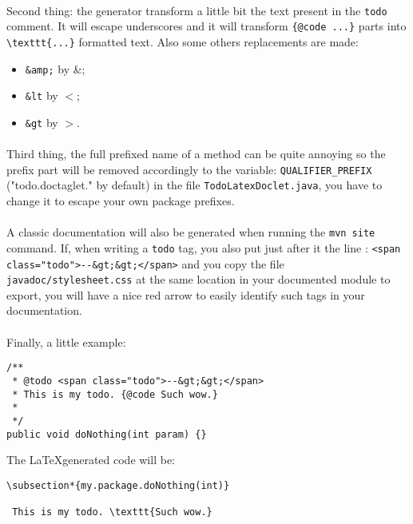 \documentclass[10pt,onecolumn]{report}
\begin{document}
\paragraph{}
Second thing: the generator transform a little bit the text present in the 
\verb!todo! comment. It will escape underscores and it will transform
\verb!{@code ...}! parts into \verb!\texttt{...}! formatted text. Also some
others replacements are made:
\begin{itemize}
\item \verb!&amp;! by \&;
\item \verb!&lt! by $<$;
\item \verb!&gt! by $>$.
\end{itemize}

\paragraph{}
Third thing, the full prefixed name of a method can be quite annoying so the
prefix part will be removed accordingly to the variable: \verb!QUALIFIER_PREFIX!
("todo.doctaglet." by default) in the file \verb!TodoLatexDoclet.java!, you have
to change it to escape your own package prefixes.

\paragraph{}
A classic documentation will also be generated when running the \verb!mvn site!
command. If, when writing a \verb!todo! tag, you also put just after it the line :
\verb!<span class="todo">--&gt;&gt;</span>! and you copy the file 
\verb!javadoc/stylesheet.css! at the same location in your documented module to
export, you will have a nice red arrow to easily identify such tags in your
documentation. 

\paragraph{}
Finally, a little example:
\begin{framed}
\begin{verbatim}
/**
 * @todo <span class="todo">--&gt;&gt;</span>
 * This is my todo. {@code Such wow.}
 *
 */
public void doNothing(int param) {}
\end{verbatim}
\end{framed}
The \LaTeX generated code will be:
\begin{framed}
\begin{verbatim}
\subsection*{my.package.doNothing(int)}

 This is my todo. \texttt{Such wow.}
\end{verbatim}
\end{framed}
\end{document}
